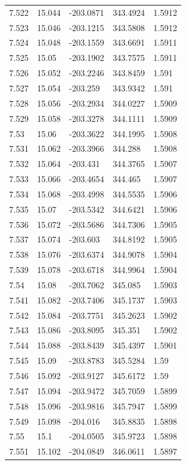 \begin{tabular}{lllll}
7.522 & 15.044 & -203.0871 & 343.4924 & 1.5912 \\
7.523 & 15.046 & -203.1215 & 343.5808 & 1.5912 \\
7.524 & 15.048 & -203.1559 & 343.6691 & 1.5911 \\
7.525 & 15.05 & -203.1902 & 343.7575 & 1.5911 \\
7.526 & 15.052 & -203.2246 & 343.8459 & 1.591 \\
7.527 & 15.054 & -203.259 & 343.9342 & 1.591 \\
7.528 & 15.056 & -203.2934 & 344.0227 & 1.5909 \\
7.529 & 15.058 & -203.3278 & 344.1111 & 1.5909 \\
7.53 & 15.06 & -203.3622 & 344.1995 & 1.5908 \\
7.531 & 15.062 & -203.3966 & 344.288 & 1.5908 \\
7.532 & 15.064 & -203.431 & 344.3765 & 1.5907 \\
7.533 & 15.066 & -203.4654 & 344.465 & 1.5907 \\
7.534 & 15.068 & -203.4998 & 344.5535 & 1.5906 \\
7.535 & 15.07 & -203.5342 & 344.6421 & 1.5906 \\
7.536 & 15.072 & -203.5686 & 344.7306 & 1.5905 \\
7.537 & 15.074 & -203.603 & 344.8192 & 1.5905 \\
7.538 & 15.076 & -203.6374 & 344.9078 & 1.5904 \\
7.539 & 15.078 & -203.6718 & 344.9964 & 1.5904 \\
7.54 & 15.08 & -203.7062 & 345.085 & 1.5903 \\
7.541 & 15.082 & -203.7406 & 345.1737 & 1.5903 \\
7.542 & 15.084 & -203.7751 & 345.2623 & 1.5902 \\
7.543 & 15.086 & -203.8095 & 345.351 & 1.5902 \\
7.544 & 15.088 & -203.8439 & 345.4397 & 1.5901 \\
7.545 & 15.09 & -203.8783 & 345.5284 & 1.59 \\
7.546 & 15.092 & -203.9127 & 345.6172 & 1.59 \\
7.547 & 15.094 & -203.9472 & 345.7059 & 1.5899 \\
7.548 & 15.096 & -203.9816 & 345.7947 & 1.5899 \\
7.549 & 15.098 & -204.016 & 345.8835 & 1.5898 \\
7.55 & 15.1 & -204.0505 & 345.9723 & 1.5898 \\
7.551 & 15.102 & -204.0849 & 346.0611 & 1.5897 \\

\end{tabular}
